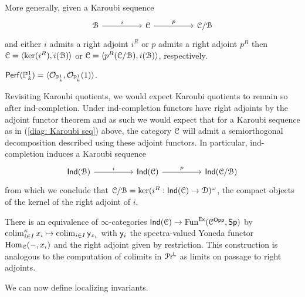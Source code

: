 More generally, given a Karoubi sequence 
\begin{equation}\label{diag: Karoubi seq}
\begin{tikzcd}
	\Bscr && \Cscr && {\Cscr/\Bscr}
	\arrow["i", from=1-1, to=1-3]
	\arrow["p", from=1-3, to=1-5]
\end{tikzcd}
\end{equation}
and either $i$ admits a right adjoint $i^{R}$ or $p$ admits a right adjoint $p^{R}$ then $\EuScript{C}=\langle\ker(i^{R}), i(\EuScript{B})\rangle$ or $\EuScript{C}=\langle p^{R}(\EuScript{C}/\EuScript{B}), i(\EuScript{B})\rangle$, respectively. 
\begin{example}
    $\mathsf{Perf}(\mathbb{P}^{1}_{k})=\langle\mathcal{O}_{\mathbb{P}^{1}_{k}},\mathcal{O}_{\mathbb{P}^{1}_{k}}(1)\rangle$. 
\end{example}
Revisiting Karoubi quotients, we would expect Karoubi quotients to remain so after ind-completion. Under ind-completion functors have right adjoints by the adjoint functor theorem and as such we would expect that for a Karoubi sequence as in (\ref{diag: Karoubi seq}) above, the category $\EuScript{C}$ will admit a semiorthogonal decomposition described using these adjoint functors. In particular, ind-completion induces a Karoubi sequence
$$%
\begin{tikzcd}
	{\Ind(\Bscr)} && {\Ind(\Cscr)} && {\Ind(\Cscr/\Bscr)}
	\arrow["i", from=1-1, to=1-3]
	\arrow["p", from=1-3, to=1-5]
\end{tikzcd}$$
from which we conclude that $\EuScript{C}/\EuScript{B}=\ker(i^{R}:\mathsf{Ind}(\EuScript{C})\to\EuScript{D})^{\omega}$, the compact objects of the kernel of the right adjoint of $i$. 
\begin{remark}
    There is an equivalence of $\infty$-categories $\mathsf{Ind}(\EuScript{C})\to\mathrm{Fun}^{\mathsf{Ex}}(\EuScript{C}^{\mathsf{Opp}}, \mathsf{Sp})$ by $\operatorname{colim}^{\kappa}_{i\in I}x_{i}\mapsto\operatorname{colim}_{i\in I}\mathsf{y}_{x_{i}}$ with $\mathsf{y}_{i}$ the spectra-valued Yoneda functor $\mathrm{Hom}_{\EuScript{C}}(-,x_{i})$ and the right adjoint given by restriction. This construction is analogous to the computation of colimits in $\EuScript{P}\mathsf{r}^{\mathsf{L}}$ as limits on passage to right adjoints. 
\end{remark} 
We can now define localizing invariants. 
